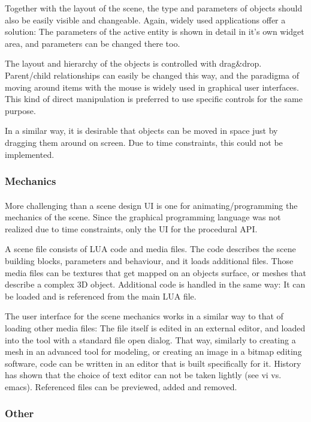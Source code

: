 Together with the layout of the scene, the type and parameters of objects should also be easily visible and changeable.
Again, widely used applications offer a solution: The parameters of the active entity is shown in detail in it's own widget area, and parameters can be changed there too.

The layout and hierarchy of the objects is controlled with drag\&drop.
Parent/child relationships can easily be changed this way, and the paradigma of moving around items with the mouse is widely used in graphical user interfaces.
This kind of direct manipulation is preferred to use specific controls for the same purpose.

In a similar way, it is desirable that objects can be moved in space just by dragging them around on screen.
Due to time constraints, this could not be implemented.

\subsubsection{Mechanics}
\paragraph{}
More challenging than a scene design UI is one for animating/programming the mechanics of the scene.
Since the graphical programming language was not realized due to time constraints, only the UI for the procedural API.

A scene file consists of LUA code and media files.
The code describes the scene building blocks, parameters and behaviour, and it loads additional files.
Those media files can be textures that get mapped on an objects surface, or meshes that describe a complex 3D object.
Additional code is handled in the same way: It can be loaded and is referenced from the main LUA file.

The user interface for the scene mechanics works in a similar way to that of loading other media files:
The file itself is edited in an external editor, and loaded into the tool with a standard file open dialog.
That way, similarly to creating a mesh in an advanced tool for modeling, or creating an image in a bitmap editing software, code can be written in an editor that is built specifically for it.
History has shown that the choice of text editor can not be taken lightly (see vi vs. emacs).
Referenced files can be previewed, added and removed.

\subsubsection{Other}

